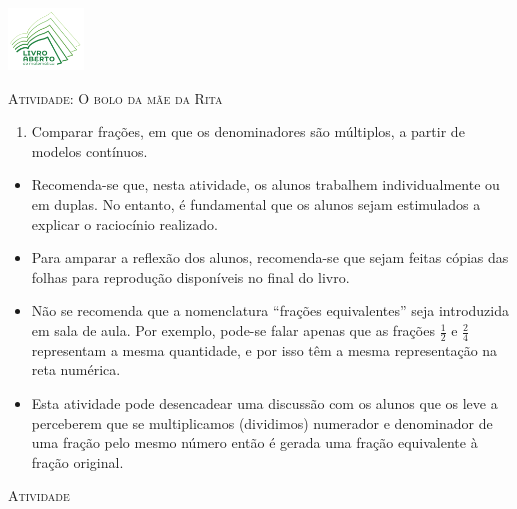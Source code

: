 \documentclass[10 pt,usenames,dvipsnames, oneside]{article}
\begin{document}
\begin{center}
  \begin{minipage}[l]{3cm}
\includegraphics[width=2cm]{../../../Figuras/logo}       
\end{minipage}\hfill
\begin{minipage}[r]{.8\textwidth}
 {\Large \scshape Atividade: O bolo da mãe da Rita}  
\end{minipage}
\end{center}
\vspace{.2cm}

\ifdefined\prof
\begin{goals}
\begin{enumerate}
\item       Comparar frações, em que os denominadores são múltiplos, a
partir de modelos contínuos.
\end{enumerate}

\tcblower

\begin{itemize}
\item       Recomenda-se que, nesta atividade, os alunos trabalhem
individualmente ou em duplas. No entanto, é fundamental que os alunos sejam
estimulados a explicar o raciocínio realizado.
\item       Para amparar a reflexão dos alunos, recomenda-se que sejam
feitas cópias das             folhas para reprodução disponíveis no final do
livro.
\item       Não se recomenda que a nomenclatura       ``frações
equivalentes''       seja introduzida em sala de aula. Por exemplo, pode-se
falar apenas que as frações $\frac{1}{2}$ e $\frac{2}{4}$ representam a mesma quantidade, e por isso
têm a mesma representação na reta numérica.
\item       Esta atividade pode desencadear uma discussão com os alunos que
os leve a perceberem que se multiplicamos (dividimos) numerador e denominador de
uma fração pelo mesmo número então é gerada uma fração equivalente à fração
original.
\end{itemize}
\end{goals}

\bigskip
\begin{center}
{\large \scshape Atividade}
\end{center}
\fi
\end{document}
